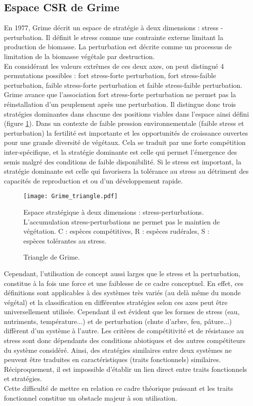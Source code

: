 \documentclass[french]{article}
\begin{document}
{\subsection{Espace CSR de Grime}
En 1977, Grime \cite{Grime1977} décrit un espace de stratégie à deux dimensions : stress - perturbation. Il définit le stress comme une contrainte externe limitant la production de biomasse. La perturbation est décrite comme un processus de limitation de la biomasse végétale par destruction.\\
\indent En considérant les valeurs extrêmes de ces deux axes, on peut distingué 4  permutations possibles : fort stress-forte perturbation, fort stress-faible perturbation, faible stress-forte perturbation et faible stress-faible perturbation. Grime avance que l'association fort stress-forte perturbation ne permet pas la réinstallation d'un peuplement après une perturbation. Il distingue donc trois stratégies dominantes dans chacune des positions viables dans l'espace ainsi défini (figure \ref{fig:Grime}). Dans un contexte de faible pression environnementale (faible stress et perturbation) la fertilité est importante et les opportunités de croissance ouvertes pour une grande diversité de végétaux. Cela se traduit par une forte compétition inter-spécifique, et la stratégie dominante est celle qui permet l'émergence des semis malgré des conditions de faible disponibilité. Si le stress est important, la stratégie dominante est celle qui favorisera la tolérance au stress au détriment des capacités de reproduction et ou d'un développement rapide.\\

 \begin{figure}[H]
 \centering
\texttt{[image: Grime\_triangle.pdf]}
 \caption{Triangle de Grime.}
\label{fig:Grime}
\footnotesize{Espace stratégique à deux dimensions : stress-perturbations. L'accumulation stress-perturbations ne permet pas le maintien de végétation. C : espèces compétitives, R : espèces rudérales, S : espèces tolérantes au stress.}
 \end{figure}

\indent Cependant, l'utilisation de concept aussi larges que le stress et la perturbation, constitue à la fois une force et une faiblesse de ce cadre conceptuel. En effet, ces définitions sont applicables à des systèmes très variés (au delà même du monde végétal) et la classification en différentes stratégies selon ces axes peut être universellement utilisée. Cependant il est évident que les formes de stress (eau, nutriments, température...) et de perturbation (chute d'arbre, feu, pâture...) diffèrent d'un système à l'autre. Les critères de compétitivité et de résistance au stress sont donc dépendants des conditions abiotiques et des autres compétiteurs du système considéré. Ainsi, des stratégies similaires entre deux systèmes ne peuvent être traduites en caractéristiques (traits fonctionnels) similaires. Réciproquement, il est impossible d'établir un lien direct entre traits fonctionnels et stratégies.\\
\indent Cette difficulté de mettre en relation ce cadre théorique puissant et les traits fonctionnel constitue un obstacle majeur à son utilisation.\\

}
\end{document}
